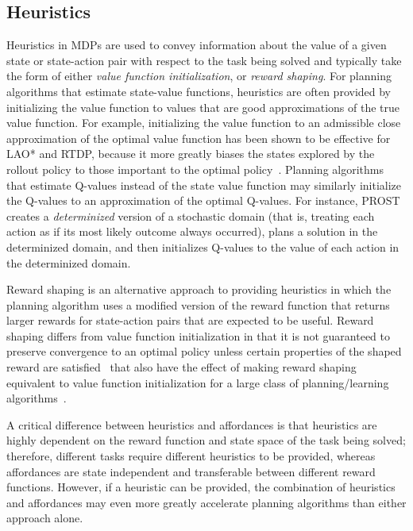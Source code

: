 \documentclass[]{article}
\begin{document}
\subsection{Heuristics}
Heuristics in MDPs are used to convey information about the value of a given state or state-action pair with respect to the task being solved and typically take the form of either {\em value function initialization},
or {\em reward shaping}. For planning algorithms that estimate state-value functions, heuristics are often
provided by initializing the value function to values that are good approximations of the true value function. For example, initializing the value function to an admissible close approximation of the optimal value function has been shown to be effective for LAO* and RTDP, because it more greatly biases the states explored by the rollout policy to those important to the optimal policy~\cite{Hansen:1999qf}. Planning algorithms that estimate Q-values instead of the state value function may similarly initialize the Q-values to an approximation of the optimal Q-values. For instance, PROST~\cite{keller2012prost} creates a {\em determinized} version of a stochastic domain (that is, treating each action as if its most likely outcome always occurred), plans a solution in the determinized domain, and then initializes Q-values to the value of each action in the determinized domain.

Reward shaping is an alternative approach to providing heuristics in which the planning algorithm uses a modified version of the reward function that returns larger rewards for state-action pairs that are expected to be useful. Reward shaping differs from value function initialization in that it is not guaranteed to preserve convergence to an optimal policy unless certain properties of the shaped reward are satisfied~\cite{potshap} that also have the effect of making reward shaping equivalent to value function initialization for a large class of planning/learning algorithms~\cite{Wiewiora:2003fk}.

A critical difference between heuristics and affordances is that heuristics are highly dependent on the reward function and state space of the task being solved; therefore, different tasks require different heuristics to be provided, whereas affordances are state independent and transferable between different reward functions. However, if a heuristic can be provided, the combination of heuristics and affordances may even more greatly accelerate planning algorithms than either approach alone.
\end{document}
